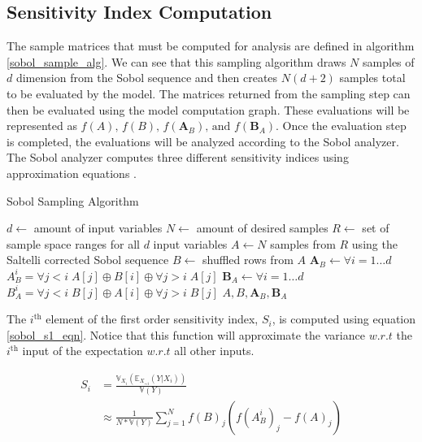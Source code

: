 \subsection{Sensitivity Index Computation\label{sec:si_comp}}
The sample matrices that must be computed for analysis are defined in algorithm \ref{sobol_sample_alg}. We can see that this sampling algorithm draws $N$ samples of $d$ dimension from the Sobol sequence and then creates $N(d+2)$ samples total to be evaluated by the model. The matrices returned from the sampling step can then be evaluated using the model computation graph. These evaluations will be represented as $f(A) \text{, } f(B) \text{, } f(\textbf{A}_{B}) \text{, and } f(\textbf{B}_{A})$. Once the evaluation step is completed, the evaluations will be analyzed according to the Sobol analyzer. The Sobol analyzer computes three different sensitivity indices using approximation equations \cite{saltelli2010varianceSA}.

\begin{algorithm}
  \caption{Sobol Sampling Algorithm}
  \label{sobol_sample_alg}
  \begin{algorithmic}[1]
    \Require $d \gets $ amount of input variables
    \Require $N \gets $ amount of desired samples
    \Require $R \gets $ set of sample space ranges for all $d$ input variables
    \State $A \gets N$ samples from $R$ using the Saltelli corrected Sobol sequence
    \State $B \gets $ shuffled rows from $A$
    \State $\textbf{A}_{B} \gets \forall i = 1 \ldots d$ $A_{B}^i = \forall j < i \; A[j] \oplus B[i] \oplus \forall j > i \; A[j]$
    \State $\textbf{B}_{A} \gets \forall i = 1 \ldots d$ $B_{A}^i = \forall j < i \; B[j] \oplus A[i] \oplus \forall j > i \; B[j]$
    \State \Return $A, B, \textbf{A}_{B}, \textbf{B}_{A}$
  \end{algorithmic}
\end{algorithm}

The $i^{\text{th}}$ element of the first order sensitivity index, $S_i$, is computed using equation \ref{sobol_s1_eqn}. Notice that this function will approximate the variance $w.r.t$ the $i^{\text{th}}$ input of the expectation $w.r.t$ all other inputs.

\begin{equation} \label{sobol_s1_eqn}
  \begin{split}
    S_i & = \frac{\mathbb{V}_{X_i}\left(\mathbb{E}_{X_{\sim i}}(Y | X_i) \right)}{\mathbb{V}(Y)} \\
     & \approx \frac{1}{N * \mathbb{V}(Y)} \sum_{j=1}^{N} f(B)_j\left( f(A_{B}^{i})_j - f(A)_j\right)
  \end{split}
\end{equation}

